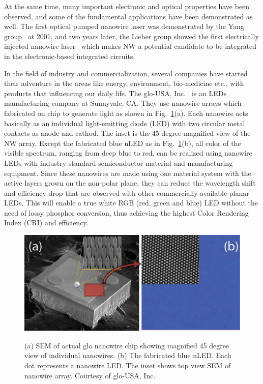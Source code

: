 At the same time, many important electronic and optical properties have been
observed, and some of the fundamental applications have been demonstrated as
well. The first optical pumped nanowire laser was demonstrated by the Yang
group~\cite{Huang:2001kv} at 2001, and two years later, the Lieber group showed
the first electrically injected nanowire laser~\cite{Duan:2003en} which makes
NW a potential candidate to be integrated in the electronic-based integrated
circuits.

In the field of industry and commercialization, several companies have started
their adventure in the areas like energy, environment, bio-medicine etc., with
products that influencing our daily life. The glo-USA, Inc.~\cite{GloLED:2017}
is an LEDs manufacturing company at Sunnyvale, CA. They use nanowire arrays
which fabricated on chip to generate light as shown in Fig.~\ref{GloLED}(a).
Each nanowire acts basically as an individual light-emitting diode (LED) with
two circular metal contacts as anode and cathod. The inset is the 45 degree
magnified view of the NW array. Except the fabricated blue nLED as in
Fig.~\ref{GloLED}(b), all color of the visible spectrum, ranging from deep blue
to red, can be realized using nanowire LEDs with industry-standard
semiconductor material and manufacturing equipment.  Since these nanowires are
made using one material system with the active layers grown on the non-polar
plane, they can reduce the wavelength shift and efficiency drop that are
observed with other commercially-available planar LEDs. This will enable a true
white RGB (red, green and blue) LED without the need of lossy phosphor
conversion, thus achieving the highest Color Rendering Index (CRI) and
efficiency.

\begin{figure}
  \caption[Scanning Electron Microscopy image of actual glo nanowire chip and the fabricated blue nLED.]{(a) SEM of actual glo nanowire chip showing magnified 45 degree view of  individual nanowires. (b) The fabricated blue nLED. Each dot represents a nanowire LED. The inset shows top view SEM of nanowire array. Courtesy of glo-USA, Inc.}
  \centering
  \includegraphics[width=\textwidth]{pictures/Introduction/GloLED}
  \label{GloLED}
\end{figure}

